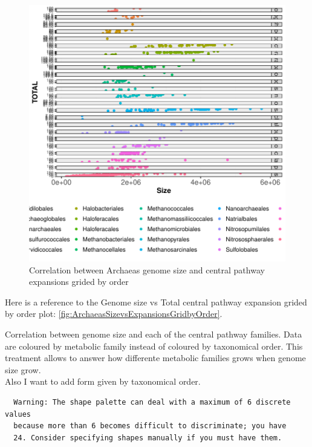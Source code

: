 \documentclass[12pt,twoside]{reedthesis}
\begin{document}
  \begin{figure}[h!tbp]
  \centering
  \includegraphics[angle = 0,scale = 1]{chapter3/ArchaeasSizevsExpansionsGridbyOrder.pdf}
  \caption[Correlation between Archaeas genome size and central pathway expansions grided by order]{\normalsize{Correlation between Archaeas genome size and central pathway expansions grided by order}}
  \label{fig:ArchaeasSizevsExpansionsGridbyOrder}
  \end{figure}
  
  Here is a reference to the Genome size vs Total central pathway
  expansion grided by order plot:
  \autoref{fig:ArchaeasSizevsExpansionsGridbyOrder}. \clearpage 
  
  Correlation between genome size and each of the central pathway
  families. Data are coloured by metabolic family instead of coloured by
  taxonomical order. This treatment allows to answer how differente
  metabolic families grows when genome size grow.\\
  Also I want to add form given by taxonomical order.
  
  \begin{verbatim}
  Warning: The shape palette can deal with a maximum of 6 discrete values
  because more than 6 becomes difficult to discriminate; you have
  24. Consider specifying shapes manually if you must have them.
  \end{verbatim}
  
\end{document}
